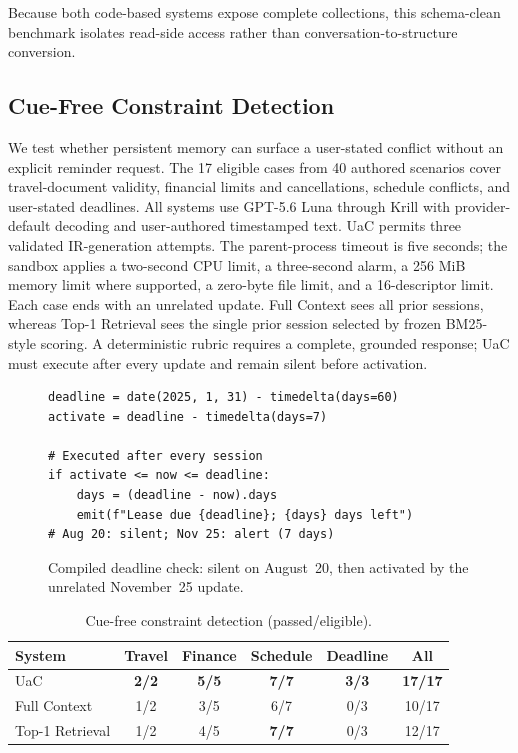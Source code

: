 Because both code-based systems expose complete collections, this schema-clean benchmark isolates read-side access rather than conversation-to-structure conversion.

\subsection{Cue-Free Constraint Detection}
\label{sec:active-service}

We test whether persistent memory can surface a user-stated conflict without an explicit reminder request. The 17 eligible cases from 40 authored scenarios cover travel-document validity, financial limits and cancellations, schedule conflicts, and user-stated deadlines. All systems use GPT-5.6 Luna through Krill with provider-default decoding and user-authored timestamped text. UaC permits three validated IR-generation attempts. The parent-process timeout is five seconds; the sandbox applies a two-second CPU limit, a three-second alarm, a 256 MiB memory limit where supported, a zero-byte file limit, and a 16-descriptor limit. Each case ends with an unrelated update. Full Context sees all prior sessions, whereas Top-1 Retrieval sees the single prior session selected by frozen BM25-style scoring. A deterministic rubric requires a complete, grounded response; UaC must execute after every update and remain silent before activation.

\begin{figure}[t]
\begin{lstlisting}[basicstyle=\scriptsize\ttfamily]
deadline = date(2025, 1, 31) - timedelta(days=60)
activate = deadline - timedelta(days=7)

# Executed after every session
if activate <= now <= deadline:
    days = (deadline - now).days
    emit(f"Lease due {deadline}; {days} days left")
# Aug 20: silent; Nov 25: alert (7 days)
\end{lstlisting}
\caption{Compiled deadline check: silent on August~20, then activated by the unrelated November~25 update.}
\label{fig:constraint-example}
\end{figure}

\begin{table}[t]
\centering
\caption{Cue-free constraint detection (passed/eligible).}
\label{tab:active-service}
\footnotesize
\setlength{\tabcolsep}{2.5pt}
\begin{tabular}{@{}lccccc@{}}
\toprule
System & Travel & Finance & Schedule & Deadline & All \\
\midrule
UaC & \textbf{2/2} & \textbf{5/5} & \textbf{7/7} & \textbf{3/3} & \textbf{17/17} \\
Full Context & 1/2 & 3/5 & 6/7 & 0/3 & 10/17 \\
Top-1 Retrieval & 1/2 & 4/5 & \textbf{7/7} & 0/3 & 12/17 \\
\bottomrule
\end{tabular}
\end{table}

